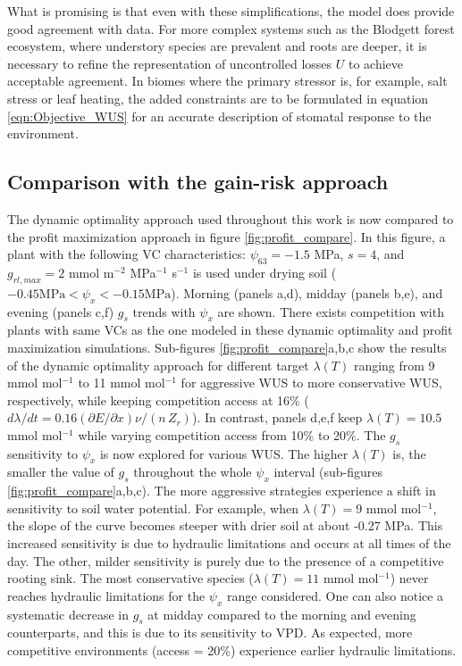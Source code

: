 \documentclass[utf8]{frontiersSCNS} %
\begin{document}
What is promising is that even with these simplifications, the model does provide good agreement with data. For more complex systems such as the Blodgett forest ecosystem, where understory species are prevalent and roots are deeper, it is necessary to refine the representation of uncontrolled losses $U$ to achieve acceptable agreement. In biomes where the primary stressor is, for example, salt stress or leaf heating, the added constraints are to be formulated in equation \ref{eqn:Objective_WUS} for an accurate description of stomatal response to the environment. 

\subsection{Comparison with the gain-risk approach}

The dynamic optimality approach used throughout this work is now compared to the profit maximization approach in figure \ref{fig:profit_compare}. In this figure, a plant with the following VC characteristics: $\psi_{63} = -1.5$ MPa, $s=4$, and $g_{rl,max} = 2$ mmol m$^{-2}$ MPa$^{-1}$ s$^{-1}$ is used under drying soil ($-0.45 \text{MPa} < \psi_x < -0.15 \text{MPa}$). Morning (panels a,d), midday (panels b,e), and evening (panels c,f) $g_s$ trends with $\psi_x$ are shown. There exists competition with plants with same VCs as the one modeled in these dynamic optimality and profit maximization simulations. Sub-figures \ref{fig:profit_compare}a,b,c show the results of the dynamic optimality approach for different target $\lambda(T)$ ranging from 9 mmol mol$^{-1}$ to 11 mmol mol$^{-1}$ for aggressive WUS to more conservative WUS, respectively, while keeping competition access at 16\% ($d\lambda/dt = 0.16 (\partial E / \partial x) \nu/(n\, Z_r) $). In contrast, panels d,e,f keep $\lambda(T)=10.5$ mmol mol$^{-1}$ while varying competition access from 10\% to 20\%.
The $g_s$ sensitivity to $\psi_x$ is now explored for various WUS. The higher $\lambda(T)$ is, the smaller the value of $g_s$ throughout the whole $\psi_x$ interval (sub-figures \ref{fig:profit_compare}a,b,c). The more aggressive strategies experience a shift in sensitivity to soil water potential. For example, when $\lambda(T)=9$ mmol mol$^{-1}$, the slope of the curve becomes steeper with drier soil at about -0.27 MPa. This increased sensitivity is due to hydraulic limitations and occurs at all times of the day. The other, milder sensitivity is purely due to the presence of a competitive rooting sink. The most conservative species ($\lambda(T) = 11$ mmol mol$^{-1}$) never reaches hydraulic limitations for the $\psi_x$ range considered. One can also notice a systematic decrease in $g_s$ at midday compared to the morning and evening counterparts, and this is due to its sensitivity to VPD.  As expected, more competitive environments (access = 20\%) experience earlier hydraulic limitations.
\end{document}
